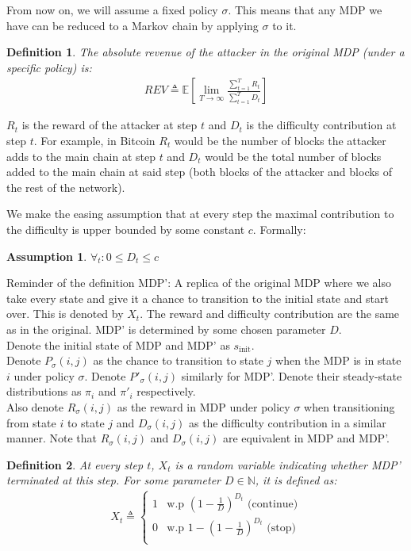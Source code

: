 \documentclass{article}
\newcommand{\E}[1]{\mathbb{E} \left[ #1 \right]}
\newcommand{\N}{\mathbb{N}}
\newcommand{\rev}{\textit{REV}}
\newtheorem{definition}{Definition}
\newtheorem{assumption}{Assumption}
\begin{document}
From now on, we will assume a fixed policy $\sigma$. This means that any MDP we have can be reduced to a Markov chain by applying $\sigma$ to it.

\begin{definition}\label{ar_def}
    The absolute revenue of the attacker in the original MDP (under a specific policy) is:
    \begin{gather*}
        \rev \triangleq \E{\lim\limits_{T\to\infty} \frac{\sum\limits_{t=1}^T R_t}{\sum\limits_{t=1}^T D_t}}
    \end{gather*}
\end{definition}
$R_t$ is the reward of the attacker at step $t$ and $D_t$ is the difficulty contribution at step $t$.
For example, in Bitcoin $R_t$ would be the number of blocks the attacker adds to the main chain at step $t$ and $D_t$ would be the total number of blocks added to the main chain at said step (both blocks of the attacker and blocks of the rest of the network).

We make the easing assumption that at every step the maximal contribution to the difficulty is upper bounded by some constant $c$. Formally:
\begin{assumption}\label{assump_d_t_bounded}
    $\forall_t : 0 \leq D_t \leq c$
\end{assumption}

Reminder of the definition MDP': A replica of the original MDP where we also take every state and give it a chance to transition to the initial state and start over. This is denoted by $X_t$. The reward and difficulty contribution are the same as in the original. MDP' is determined by some chosen parameter $D$. \\
Denote the initial state of MDP and MDP' as $s_\text{init}$. \\
Denote $P_\sigma(i,j)$ as the chance to transition to state $j$ when the MDP is in state $i$ under policy $\sigma$. Denote $P'_\sigma(i,j)$ similarly for MDP'. Denote their steady-state distributions as $\pi_i$ and $\pi'_i$ respectively. \\
Also denote $R_\sigma(i,j)$ as the reward in MDP under policy $\sigma$ when transitioning from state $i$ to state $j$ and $D_\sigma(i,j)$ as the difficulty contribution in a similar manner. Note that $R_\sigma(i,j)$ and $D_\sigma(i,j)$ are equivalent in MDP and MDP'.

\begin{definition}\label{x_t_def}
    At every step $t$, $X_t$ is a random variable indicating whether MDP' terminated at this step. For some parameter $D \in \N$, it is defined as:
    \begin{gather*}
        X_t \triangleq
        \begin{cases}
            1 & \text{w.p } \left( 1 -\frac{1}{D} \right)^{D_t} \text{ (continue)} \\
            0 & \text{w.p } 1 - \left( 1 -\frac{1}{D} \right)^{D_t} \text{ (stop)} \\
        \end{cases}
    \end{gather*}
\end{definition}
\end{document}
